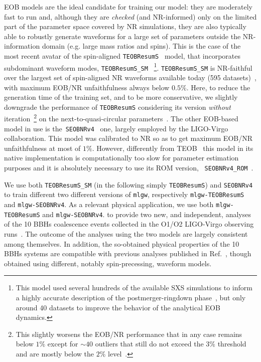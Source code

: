 EOB models are the ideal candidate for training our model: they are moderately fast to run 
and, although they are {\it checked} (and NR-informed) only on the limited part of the 
parameter space covered by NR simulations,  they are also typically able to robustly 
generate waveforms for a large set of parameters outside the NR-information 
domain (e.g. large mass ratios and spins).
This is the case of the most recent avatar of the spin-aligned \texttt{TEOBResumS}~\cite{Nagar:2018zoe} 
model, that incorporates subdominant waveform modes, \texttt{TEOBResumS\_SM}~\cite{Nagar:2019wds,Nagar:2020pcj}
\footnote{This model used several hundreds of the available SXS simulations to inform a highly 
accurate description of the postmerger-ringdown phase~\cite{Damour:2014yha}, but 
only around 40 datasets to improve the behavior of the analytical EOB dynamics.}.
\texttt{TEOBResumS\_SM} is NR-faithful over the largest set of spin-aligned NR waveforms 
available today (595 datasets)~\cite{Nagar:2020pcj}, with maximum EOB/NR unfaithfulness 
always below $0.5\%$. Here, to reduce the generation time of the training set, and to be more 
conservative, we slightly downgrade the performance of \texttt{TEOBResumS} considering 
its version {\it without} iteration~\footnote{This slightly worsens the EOB/NR performance that in
any case remains below $1\%$ except for $\sim 40$ outliers that still do not exceed the $3\%$ 
threshold and are mostly below the $2\%$ level~\cite{Riemenschneider:2020}.} on 
the next-to-quasi-circular parameters~\cite{Nagar:2020pcj}.
The other EOB-based model in 
use is the~\texttt{SEOBNRv4}~\cite{Taracchini:2013rva,Bohe:2016gbl} one, largely employed 
by the LIGO-Virgo collaboration. This model was calibrated to NR so as to get  
maximum EOB/NR unfaithfulness at most of $1\%$. However, differently from 
TEOB~\cite{Nagar:2018zoe} this model in its native implementation is computationally 
too slow for parameter estimation purposes and it is absolutely necessary 
to use its ROM version, ~\texttt{SEOBNRv4\_ROM}~\cite{Bohe:2016gbl}.

We use both \texttt{TEOBResumS\_SM} (in the following simply \texttt{TEOBResumS}) 
and \texttt{SEOBNRv4} to train different two different versions of \texttt{mlgw}, respectively
\texttt{mlgw-TEOBResumS} and \texttt{mlgw-SEOBNRv4}.
As a relevant physical application, we use both 
\texttt{mlgw-TEOBResumS} and \texttt{mlgw-SEOBNRv4}.
to provide two new, and independent, analyses of the 10 BBHs 
coalescence events collected in the O1/O2 LIGO-Virgo observing 
runs~\cite{LIGOScientific:2018mvr}. The outcome of the analyses 
using the two models are largely consistent among themselves.
In addition,  the so-obtained physical properties of the 10 BBHs
systems are compatible with previous analyses published in
Ref.~\cite{LIGOScientific:2018mvr}, though obtained using
different, notably spin-precessing, waveform models.

